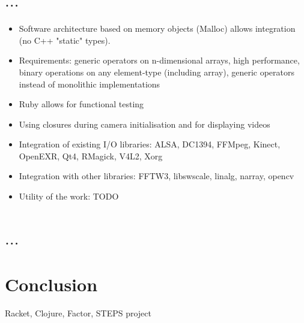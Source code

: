 \documentclass[10pt,journal,compsoc]{joser13}
\begin{document}
\section{$\ldots$}
\begin{itemize}
  \item Software architecture based on memory objects (Malloc) allows
    integration (no C++ "static" types).
  \item Requirements: generic operators on n-dimensional arrays, high
    performance, binary operations on any element-type (including array),
    generic operators instead of monolithic implementations
  \item Ruby allows for functional testing
  \item Using closures during camera initialisation and for displaying videos
\end{itemize}
\begin{itemize}
  \item Integration of existing I/O libraries: ALSA, DC1394, FFMpeg, Kinect,
    OpenEXR, Qt4, RMagick, V4L2, Xorg
  \item Integration with other libraries: FFTW3, libswscale, linalg, narray,
    opencv
  \item Utility of the work: TODO
\end{itemize}

\section{$\ldots$}

\section{Conclusion}
Racket, Clojure, Factor, STEPS project
\end{document}
